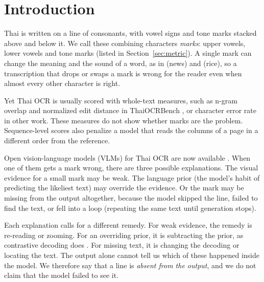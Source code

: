 \section{Introduction}
Thai is written on a line of consonants, with vowel signs and tone marks stacked above and below it. We call these combining characters \emph{marks}: upper vowels, lower vowels and tone marks (listed in Section~\ref{sec:metric}). A single mark can change the meaning and the sound of a word, as in  (news) and  (rice), so a transcription that drops or swaps a mark is wrong for the reader even when almost every other character is right.

Yet Thai OCR is usually scored with whole-text measures, such as n-gram overlap and normalized edit distance in ThaiOCRBench \cite{nonesung2025thaiocrbench}, or character error rate in other work. These measures do not show whether marks are the problem. Sequence-level scores also penalize a model that reads the columns of a page in a different order from the reference.

Open vision-language models (VLMs) for Thai OCR are now available \cite{nonesung2026typhoonocr,nectec2026pathumma,pipatanakul2026synthetic}. When one of them gets a mark wrong, there are three possible explanations. The visual evidence for a small mark may be weak. The language prior (the model's habit of predicting the likeliest text) may override the evidence. Or the mark may be missing from the output altogether, because the model skipped the line, failed to find the text, or fell into a loop (repeating the same text until generation stops).

Each explanation calls for a different remedy. For weak evidence, the remedy is re-reading or zooming. For an overriding prior, it is subtracting the prior, as contrastive decoding does \cite{leng2024vcd,favero2024m3id}. For missing text, it is changing the decoding or locating the text. The output alone cannot tell us which of these happened inside the model. We therefore say that a line is \emph{absent from the output}, and we do not claim that the model failed to see it.

